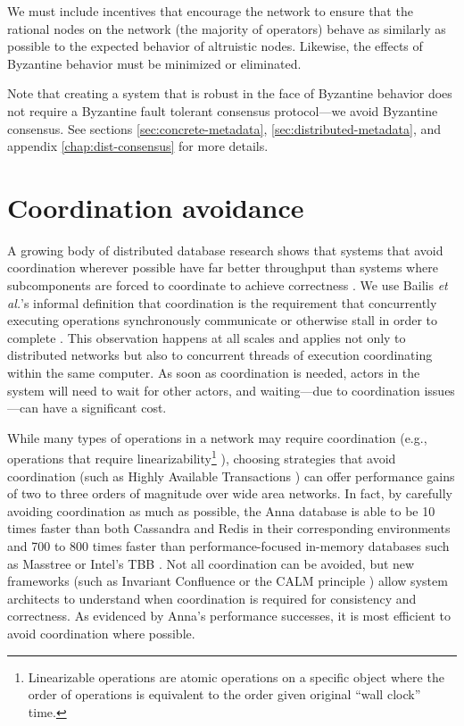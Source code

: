 \documentclass[8pt,fleqn,openany]{book}
\begin{document}
We must include incentives that encourage the network to ensure that the
rational nodes on the network (the majority of operators) behave as similarly
as possible to the expected behavior of altruistic nodes.
Likewise, the effects of Byzantine behavior must be minimized or eliminated.

Note that creating a system that is robust in the face of Byzantine behavior
does not require a Byzantine fault tolerant consensus protocol---we avoid
Byzantine consensus. See sections \ref{sec:concrete-metadata},
\ref{sec:distributed-metadata}, and appendix \ref{chap:dist-consensus} for
more details.

\section{Coordination avoidance}\label{sec:coordination-avoidance}

A growing body of distributed database research shows that systems that
avoid coordination wherever possible have far better throughput than systems
where subcomponents are forced to coordinate to achieve correctness
\cite{cap1, cap2, consistency-vs-latency, hat, i-confluence, anna,
calm1, calm2}.
We use Bailis {\em et al.}'s informal definition
that coordination is the requirement that concurrently executing operations
synchronously communicate or otherwise stall in order to complete
\cite{i-confluence}.
This observation happens at all scales and applies not only to distributed
networks but also to
concurrent threads of execution coordinating within the same computer.
As soon as coordination is needed, actors in the system will need to wait for
other actors, and waiting---due to coordination issues---can have a significant
cost.

While many types of operations in a network may require coordination
(e.g., operations that require linearizability\footnote{
Linearizable operations are atomic operations on a specific object where
the order of operations is equivalent to the order given original ``wall clock''
time.
}
\cite{jepsen-consistency, hat, vv-consistency}), choosing strategies that
avoid coordination (such as Highly Available Transactions \cite{hat}) can offer
performance gains of two to three orders of magnitude over wide area networks.
In fact, by carefully avoiding coordination as much as possible, the Anna
database \cite{anna} is able to be 10 times faster than both Cassandra and Redis in their
corresponding environments and 700 to 800 times faster than
performance-focused in-memory databases such as Masstree or Intel's TBB
\cite{anna-announce}.
Not all coordination can be avoided, but new frameworks (such as Invariant
Confluence \cite{i-confluence} or the CALM principle \cite{calm1, calm2})
allow system architects to understand when coordination is required for
consistency and correctness. As evidenced
by Anna's performance successes, it is most efficient to avoid coordination
where possible.
\end{document}
